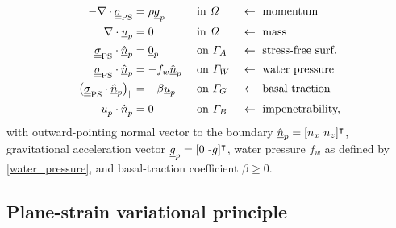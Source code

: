 {\small
\begin{align}
  \label{ps_cons_momentum}
  -\nabla \cdot \underline{\underline{\sigma}}_{\text{PS}} &= \rho\underline{g}_p &&\text{ in } \varOmega &&\leftarrow \text{ momentum} \\
  \label{ps_cons_mass}
  \nabla \cdot \underline{u}_p &= 0 &&\text{ in } \varOmega &&\leftarrow \text{ mass}  \\
  \label{ps_surface_stress}
  \underline{\underline{\sigma}}_{\text{PS}} \cdot \underline{\hat{n}}_p &= \underline{0}_p &&\text{ on } \varGamma_A &&\leftarrow \text{ stress-free surf.} \\
  \label{ps_water_stress}
  \underline{\underline{\sigma}}_{\text{PS}} \cdot \underline{\hat{n}}_p &= -f_w \underline{\hat{n}}_p &&\text{ on } \varGamma_W &&\leftarrow \text{ water pressure} \\
  \label{ps_basal_drag}
  \big( \underline{\underline{\sigma}}_{\text{PS}} \cdot \underline{\hat{n}}_p \big)_{\Vert} &= -\beta \underline{u}_p &&\text{ on } \varGamma_G &&\leftarrow \text{ basal traction } \\
  \label{ps_impenetrability}
  \underline{u}_p \cdot \underline{\hat{n}}_p &= 0 &&\text{ on } \varGamma_B &&\leftarrow \text{ impenetrability,}
\end{align}}
with outward-pointing normal vector to the boundary $\normal_p = [n_x\ n_z]^\intercal$, gravitational acceleration vector $\underline{g}_p = [0\ \text{-}g]^\intercal$, water pressure $f_w$ as defined by \cref{water_pressure}, and basal-traction coefficient $\beta \geq 0$.

\subsection{Plane-strain variational principle} \label{ssn_plane_strain_var_prin}

